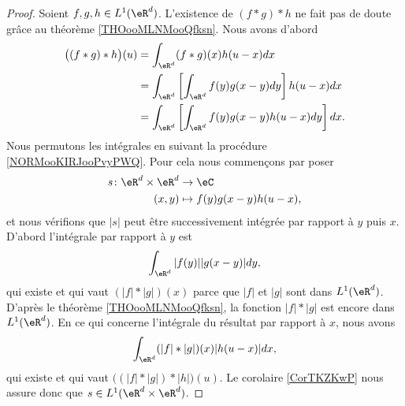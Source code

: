 \begin{proof}
	Soient \( f,g,h\in L^1(\eR^d)\). L'existence de \( (f*g)*h\) ne fait pas de doute grâce au théorème \ref{THOooMLNMooQfksn}. Nous avons d'abord
	\begin{subequations}
		\begin{align}
			\big( (f*g)*h \big)(u) & =\int_{\eR^d}(f*g)(x)h(u-x)dx                                                                  \\
			                       & =\int_{\eR^d}\left[ \int_{\eR^d}f(y)g(x-y)dy \right]h(u-x)dx                                   \\
			                       & =\int_{\eR^d}\left[ \int_{\eR^d}f(y)g(x-y)h(u-x)dy \right]dx.      \label{SUBEQooJKRHooDaScXV}
		\end{align}
	\end{subequations}
	Nous permutons les intégrales en suivant la procédure \ref{NORMooKIRJooPvyPWQ}. Pour cela nous commençons par poser
	\begin{equation}
		\begin{aligned}
			s\colon \eR^d\times \eR^d & \to \eC                   \\
			(x,y)                     & \mapsto f(y)g(x-y)h(u-x),
		\end{aligned}
	\end{equation}
	et nous vérifions que \( | s |\) peut être successivement intégrée par rapport à \( y\) puis \( x\). D'abord l'intégrale par rapport à \( y\) est
	\begin{equation}
		\int_{\eR^d}| f(y) | |g(x-y) |dy,
	\end{equation}
	qui existe et qui vaut \(   (| f |*| g |)(x)   \) parce que \( | f |\) et \( | g |\) sont dans \( L^1(\eR^d)\). D'après le théorème \ref{THOooMLNMooQfksn}, la fonction \( | f |*| g |\) est encore dans \( L^1(\eR^d)\). En ce qui concerne l'intégrale du résultat par rapport à \( x\), nous avons
	\begin{equation}
		\int_{\eR^d}(| f |*| g |)(x)| h(u-x) |dx,
	\end{equation}
	qui existe et qui vaut \( \big( (| f |*| g |)*| h |\big)(u)\). Le corolaire \ref{CorTKZKwP} nous assure donc que \( s\in L^1(\eR^d\times \eR^d)\).


\end{proof}
